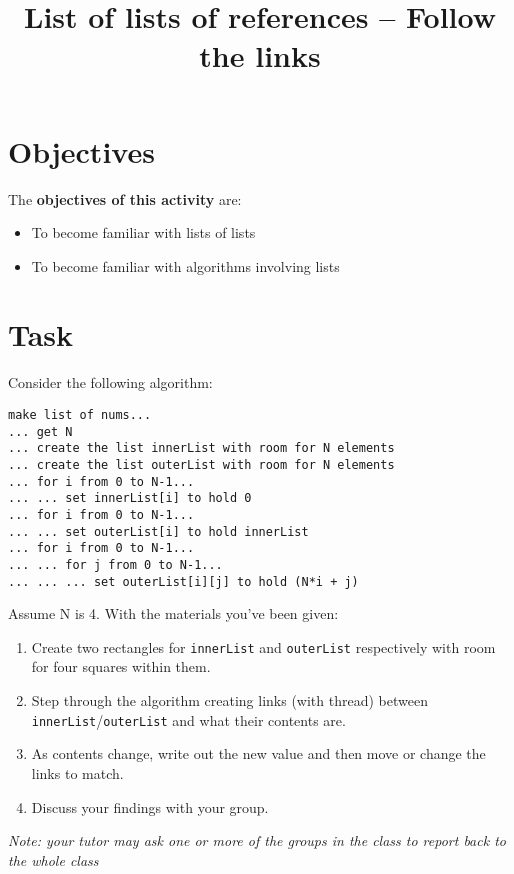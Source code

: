 \documentclass[a4paper,12pt]{article}
\title{List of lists of references -- Follow the links}
\author{}
\date{}
\begin{document}
\maketitle

\section*{Objectives}

The \textbf{objectives of this activity} are:
\begin{itemize}
  \item To become familiar with lists of lists
  \item To become familiar with algorithms involving lists
\end{itemize}

\section*{Task}

Consider the following algorithm:
\begin{verbatim}
make list of nums...
... get N
... create the list innerList with room for N elements
... create the list outerList with room for N elements
... for i from 0 to N-1...
... ... set innerList[i] to hold 0
... for i from 0 to N-1...
... ... set outerList[i] to hold innerList
... for i from 0 to N-1...
... ... for j from 0 to N-1...
... ... ... set outerList[i][j] to hold (N*i + j)
\end{verbatim}
Assume N is 4. With the materials you've been given:
\begin{enumerate}
	\item Create two rectangles for \texttt{innerList} and \texttt{outerList} respectively with room for four squares within them.
	\item Step through the algorithm creating links (with thread) between \texttt{innerList}/\texttt{outerList} and what their contents are.
	\item As contents change, write out the new value and then move or change the links to match.
	\item Discuss your findings with your group. 
\end{enumerate}
\textit{Note: your tutor may ask one or more of the groups in the class to report back to the whole class}
\end{document}
